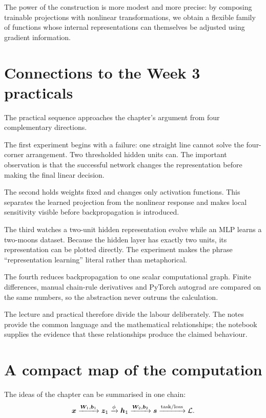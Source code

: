 The power of the construction is more modest and more precise: by composing trainable projections with nonlinear transformations, we obtain a flexible family of functions whose internal representations can themselves be adjusted using gradient information.

\section{Connections to the Week 3 practicals}

The practical sequence approaches the chapter's argument from four complementary directions.

The first experiment begins with a failure: one straight line cannot solve the four-corner arrangement. Two thresholded hidden units can. The important observation is that the successful network changes the representation before making the final linear decision.

The second holds weights fixed and changes only activation functions. This separates the learned projection from the nonlinear response and makes local sensitivity visible before backpropagation is introduced.

The third watches a two-unit hidden representation evolve while an MLP learns a two-moons dataset. Because the hidden layer has exactly two units, its representation can be plotted directly. The experiment makes the phrase ``representation learning'' literal rather than metaphorical.

The fourth reduces backpropagation to one scalar computational graph. Finite differences, manual chain-rule derivatives and PyTorch autograd are compared on the same numbers, so the abstraction never outruns the calculation.

The lecture and practical therefore divide the labour deliberately. The notes provide the common language and the mathematical relationships; the notebook supplies the evidence that these relationships produce the claimed behaviour.

\section{A compact map of the computation}

The ideas of the chapter can be summarised in one chain:
\[
\bm{x}
\xrightarrow{\bm{W}_1,\bm{b}_1}
\bm{z}_1
\xrightarrow{\phi}
\bm{h}_1
\xrightarrow{\bm{W}_2,\bm{b}_2}
\bm{s}
\xrightarrow{\text{task/loss}}
\mathcal{L}.
\]

